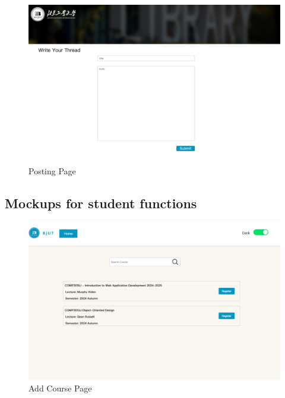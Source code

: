 \documentclass[12pt]{article}
\begin{document}
\begin{figure}[H]
    \centering
    \includegraphics[width=\textwidth]{mockups/common/postforum.png}
    \caption{Posting Page}
    \label{fig:posting_page}
\end{figure}

\subsection{Mockups for student functions}

\begin{figure}[H]
    \centering
    \includegraphics[width=\textwidth]{mockups/student/addcourse.png}
    \caption{Add Course Page}
    \label{fig:addcourse_page}
\end{figure}
\end{document}
